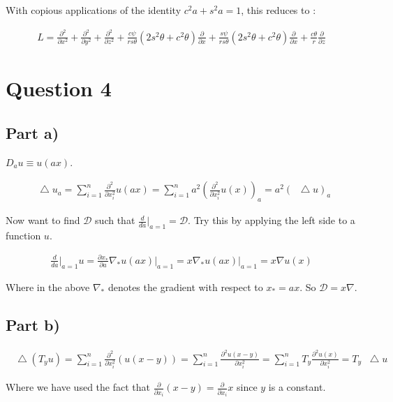 \documentclass[a4paper,12pt]{article}
\newcommand*\Laplace{\mathop{}\!\mathbin\bigtriangleup}
\begin{document}
With copious applications of the identity $c^2a + s^2a = 1$, this reduces to :

\begin{eqnarray}
L = \frac{\partial^2}{\partial x^2} + \frac{\partial^2}{\partial y^2} + \frac{\partial^2}{\partial z^2} + \frac{c\psi}{r s\theta}\left(2 s^2\theta + c^2\theta\right)\frac{\partial}{\partial x} + \frac{s\psi}{r s\theta}\left(2s^2\theta + c^2\theta\right)\frac{\partial}{\partial x} + \frac{c\theta}{r}\frac{\partial}{\partial z}\nonumber
\end{eqnarray}

\section{Question 4}
\subsection{Part a)}
$D_au\equiv u(ax)$.

\begin{eqnarray}
\Laplace u_a = \sum_{i=1}^n \frac{\partial^2}{\partial x_i^2}u(ax) = \sum_{i=1}^n a^2 \left(\frac{\partial^2}{\partial x_i^2}u(x)\right)_a = a^2(\Laplace u)_a
\end{eqnarray}

Now want to find $\mathcal{D}$ such that $\frac{d}{da}\big|_{a=1} = \mathcal{D}$. Try this by applying the left side to a function $u$.

\begin{eqnarray}
\frac{d}{da}\Big|_{a=1}u = \frac{\partial x_*}{\partial a}\nabla_{*}u(ax)\Big|_{a=1} = x\nabla_* u(ax)\Big|_{a=1} = x\nabla u(x)\nonumber
\end{eqnarray}

Where in the above $\nabla_{*}$ denotes the gradient with respect to $x_* = ax$. So $\mathcal{D} = x\nabla$.

\subsection{Part b)}

\begin{eqnarray}
\Laplace(T_y u) = \sum_{i=1}^n \frac{\partial^2}{\partial x_i^2}(u(x-y)) = \sum_{i=1}^n \frac{\partial^2u(x-y)}{\partial x_i^2} = \sum_{i=1}^n T_y\frac{\partial^2u(x)}{\partial x_i^2} = T_y\Laplace u\nonumber
\end{eqnarray}

Where we have used the fact that $\frac{\partial}{\partial x_i} (x-y) = \frac{\partial}{\partial x_i}x$ since $y$ is a constant.
\end{document}
